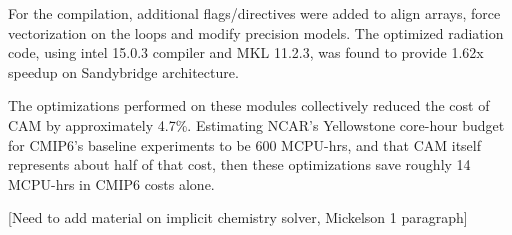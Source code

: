 For the compilation, additional flags/directives were added to align arrays, force vectorization on the loops and modify precision models. 
The optimized radiation code, using intel 15.0.3 compiler and MKL 11.2.3, was found to provide 1.62x speedup on Sandybridge architecture. 

The optimizations performed on these modules collectively reduced the cost of CAM by approximately 4.7\%. Estimating NCAR’s Yellowstone core-hour budget for CMIP6’s baseline experiments to be 600 MCPU-hrs, and that CAM itself represents about half of that cost, then these optimizations save roughly 14 MCPU-hrs in CMIP6 costs alone. 

{\color{red} [Need to add material on implicit chemistry solver, Mickelson 1 paragraph]}
